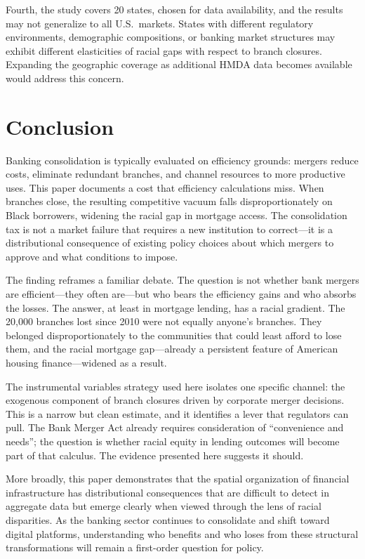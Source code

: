 \documentclass[12pt]{article}
\begin{document}
Fourth, the study covers 20 states, chosen for data availability, and the results may not generalize to all U.S.\ markets. States with different regulatory environments, demographic compositions, or banking market structures may exhibit different elasticities of racial gaps with respect to branch closures. Expanding the geographic coverage as additional HMDA data becomes available would address this concern.


\section{Conclusion}
\label{sec:conclusion}

Banking consolidation is typically evaluated on efficiency grounds: mergers reduce costs, eliminate redundant branches, and channel resources to more productive uses. This paper documents a cost that efficiency calculations miss. When branches close, the resulting competitive vacuum falls disproportionately on Black borrowers, widening the racial gap in mortgage access. The consolidation tax is not a market failure that requires a new institution to correct---it is a distributional consequence of existing policy choices about which mergers to approve and what conditions to impose.

The finding reframes a familiar debate. The question is not whether bank mergers are efficient---they often are---but who bears the efficiency gains and who absorbs the losses. The answer, at least in mortgage lending, has a racial gradient. The 20,000 branches lost since 2010 were not equally anyone's branches. They belonged disproportionately to the communities that could least afford to lose them, and the racial mortgage gap---already a persistent feature of American housing finance---widened as a result.

The instrumental variables strategy used here isolates one specific channel: the exogenous component of branch closures driven by corporate merger decisions. This is a narrow but clean estimate, and it identifies a lever that regulators can pull. The Bank Merger Act already requires consideration of ``convenience and needs''; the question is whether racial equity in lending outcomes will become part of that calculus. The evidence presented here suggests it should.

More broadly, this paper demonstrates that the spatial organization of financial infrastructure has distributional consequences that are difficult to detect in aggregate data but emerge clearly when viewed through the lens of racial disparities. As the banking sector continues to consolidate and shift toward digital platforms, understanding who benefits and who loses from these structural transformations will remain a first-order question for policy.
\end{document}
